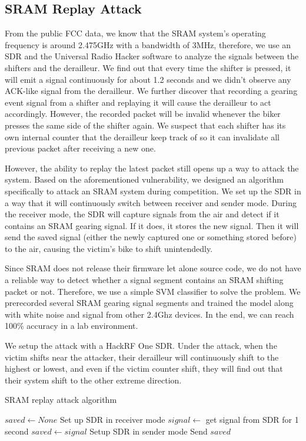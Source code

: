 \documentclass[letterpaper,twocolumn,10pt]{article}
\begin{document}
\subsection{SRAM Replay Attack}
From the public FCC data, we know that the SRAM system's operating frequency is around 2.475GHz with a bandwidth of 3MHz, therefore, we use an SDR and the Universal Radio Hacker software\cite{urh}  to analyze the signals between the shifters and the derailleur. We find out that every time the shifter is pressed, it will emit a signal continuously for about 1.2 seconds and we didn't observe any ACK-like signal from the derailleur. We further discover that recording a gearing event signal from a shifter and replaying it will cause the derailleur to act accordingly. However, the recorded packet will be invalid whenever the biker presses the same side of the shifter again. We suspect that each shifter has its own internal counter that the derailleur keep track of so it can invalidate all previous packet after receiving a new one.

However, the ability to replay the latest packet still opens up a way to attack the system. Based on the aforementioned vulnerability, we designed an algorithm specifically to attack an SRAM system during competition. We set up the SDR in a way that it will continuously switch between receiver and sender mode. During the receiver mode, the SDR will capture signals from the air and detect if it contains an SRAM gearing signal. If it does, it stores the new signal. Then it will send the saved signal (either the newly captured one or something stored before) to the air, causing the victim's bike to shift unintendedly. 

Since SRAM does not release their firmware let alone source code, we do not have a reliable way to detect whether a signal segment contains an SRAM shifting packet or not. Therefore, we use a simple SVM classifier to solve the problem. We prerecorded several SRAM gearing signal segments and trained the model along with white noise and signal from other 2.4Ghz devices. In the end, we can reach 100\% accuracy in a lab environment.

We setup the attack with a HackRF One SDR. Under the attack, when the victim shifts near the attacker, their derailleur will continuously shift to the highest or lowest, and even if the victim counter shift, they will find out that their system shift to the other extreme direction.
\begin{algorithm}
\caption{SRAM replay attack algorithm}\label{alg:cap}
\begin{algorithmic}[1]
  \State $saved \gets None$
    \State Set up SDR in receiver mode
    \State $signal \gets$ get signal from SDR for 1 second
        \State $saved \gets signal$
    \State Setup SDR in sender mode
    \State Send $saved$
    \EndIf 
  \EndWhile
  \end{algorithmic}
\end{algorithm}
\end{document}
